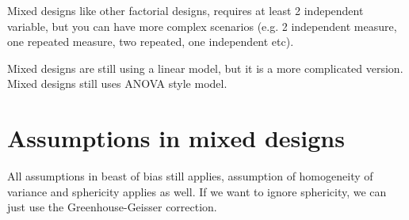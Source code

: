 
Mixed designs like other factorial designs, requires at least 2 independent variable, but you can have more complex scenarios (e.g. 2 independent measure, one repeated measure, two repeated, one independent etc).

Mixed designs are still using a linear model, but it is a more complicated version. 
Mixed designs still uses ANOVA style model. 

\section{Assumptions in mixed designs}
All assumptions in beast of bias still applies, assumption of homogeneity of variance and sphericity applies as well. If we want to ignore sphericity, we can just use the Greenhouse-Geisser correction. 